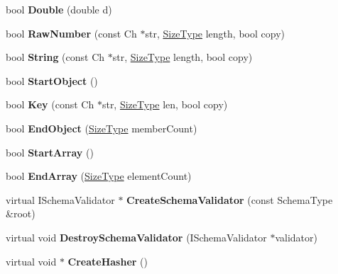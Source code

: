 \begin{DoxyCompactItemize}
\mbox{\label{a02244_aed0532dbda3ac6f3ca7196af06066b86}} 
bool {\bfseries Double} (double d)
\item 
\mbox{\label{a02244_ae4f024145421d2c1dde08a9de528722a}} 
bool {\bfseries Raw\+Number} (const Ch $\ast$str, \hyperlink{a00560_a5ed6e6e67250fadbd041127e6386dcb5}{Size\+Type} length, bool copy)
\item 
\mbox{\label{a02244_a33cf3f83307a8fea38c3238ef75c3d58}} 
bool {\bfseries String} (const Ch $\ast$str, \hyperlink{a00560_a5ed6e6e67250fadbd041127e6386dcb5}{Size\+Type} length, bool copy)
\item 
\mbox{\label{a02244_a59972d612c3d37aae9a30222e428d216}} 
bool {\bfseries Start\+Object} ()
\item 
\mbox{\label{a02244_a6d08b458216ec4a09eed9d94800d05c1}} 
bool {\bfseries Key} (const Ch $\ast$str, \hyperlink{a00560_a5ed6e6e67250fadbd041127e6386dcb5}{Size\+Type} len, bool copy)
\item 
\mbox{\label{a02244_aa89e14f0f731f6acdec22a0f7e003037}} 
bool {\bfseries End\+Object} (\hyperlink{a00560_a5ed6e6e67250fadbd041127e6386dcb5}{Size\+Type} member\+Count)
\item 
\mbox{\label{a02244_aba13751f802531ed8cbd850778ea993c}} 
bool {\bfseries Start\+Array} ()
\item 
\mbox{\label{a02244_a67b501f0f65d40e0086ca8216882b34f}} 
bool {\bfseries End\+Array} (\hyperlink{a00560_a5ed6e6e67250fadbd041127e6386dcb5}{Size\+Type} element\+Count)
\item 
\mbox{\label{a02244_af074f9c8f2cfc07e1b3d3f8862e7ef11}} 
virtual I\+Schema\+Validator $\ast$ {\bfseries Create\+Schema\+Validator} (const Schema\+Type \&root)
\item 
\mbox{\label{a02244_ae24fa298e328f1fd7dda2ef6267156d2}} 
virtual void {\bfseries Destroy\+Schema\+Validator} (I\+Schema\+Validator $\ast$validator)
\item 
\mbox{\label{a02244_abc377481583ca2095fb784be88887faa}} 
virtual void $\ast$ {\bfseries Create\+Hasher} ()

\end{DoxyCompactItemize}
